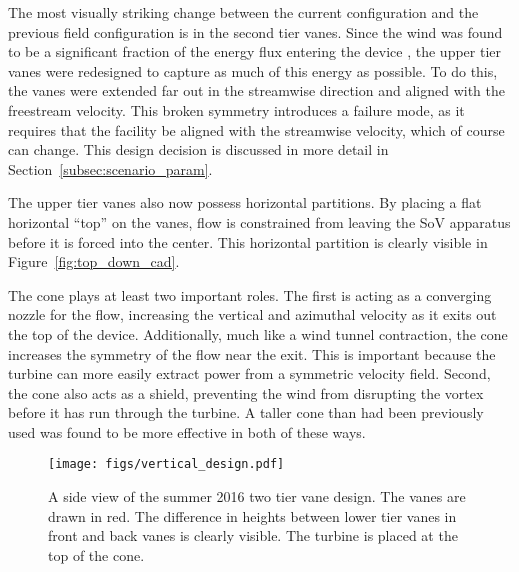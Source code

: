 The most visually striking change between the current configuration and
the previous field configuration is in the second tier vanes. 
Since the wind was found to be a
significant fraction of the energy flux entering the device , 
 the upper tier vanes were redesigned to capture as much of this
energy as possible. To do this, the vanes were extended far out in the
streamwise direction and aligned with the freestream velocity. 
This broken symmetry introduces a failure mode, as it
requires that the facility be aligned with the streamwise velocity, which of 
course can change. This design decision is discussed in more detail in
Section~\ref{subsec:scenario_param}. 

The upper tier vanes also now possess horizontal partitions. By placing
a flat horizontal ``top'' on the vanes, flow is constrained from
leaving the SoV apparatus before it is forced into the
center. This horizontal partition is clearly visible in
Figure~\ref{fig:top_down_cad}.   

The cone plays at least two important roles. The first is acting as a
converging nozzle for the flow, increasing the vertical and azimuthal
velocity as it exits out the top of the device. Additionally, much like
a wind tunnel contraction, the cone increases the
symmetry of the flow near the exit. This is important because the turbine 
can more easily extract power from a symmetric velocity
field. 
Second, the cone also acts as a shield, preventing the wind
from disrupting the vortex before it has run through the
turbine. A taller cone than had been previously used was found 
to be more effective in both of these ways.



\begin{figure}[!htb]
  \begin{center}
   \texttt{[image: figs/vertical\_design.pdf]}
   \caption{A side view of the summer 2016 two tier vane design. The
     vanes are drawn in red. The difference in heights between lower
     tier vanes in front and back vanes is clearly visible. The turbine
     is placed at the top of the cone.}
   \label{fig:vertical_design}
  \end{center}
 \end{figure}

